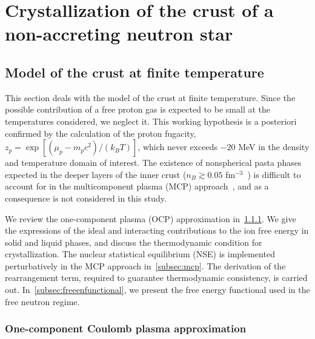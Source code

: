 \chapter{Crystallization of the crust of a non-accreting neutron star}


\minitoc\newpage

\section{Model of the crust at finite temperature}\label{sec:modelcrusttemp}

This section deals with the model of the crust at finite temperature. 
Since the possible contribution of a free proton gas is expected to be small at 
the temperatures considered, we neglect it. This working hypothesis 
is a posteriori confirmed by the calculation of the proton fugacity, 
$z_p = \exp[(\mu_p-m_pc^2)/(k_B T)]$, which never exceeds $-20$ MeV in 
the density and temperature domain of interest. 
The existence of nonspherical pasta phases expected in the deeper layers of the 
inner crust ($n_B \gtrsim 0.05$ fm$^{-3}$~\cite{Pearson2020}) is difficult to 
account for in the multicomponent plasma (MCP) approach~\cite{Barros2020}, and 
as a consequence is not considered in this study.

We review the one-component plasma (OCP) approximation 
in~\ref{subsec:ocp}. We give the expressions of the ideal and interacting
contributions to the ion free energy in solid and liquid phases, and discuss 
the thermodynamic condition for crystallization. The nuclear statistical
equilibrium (NSE) is implemented perturbatively in the MCP approach 
in~\ref{subsec:mcp}. The derivation of the rearrangement term, 
required to guarantee thermodynamic consistency, is carried out.
In~\ref{subsec:freeenfunctional}, we present the free energy functional used in
the free neutron regime.

\subsection{One-component Coulomb plasma approximation}\label{subsec:ocp}

